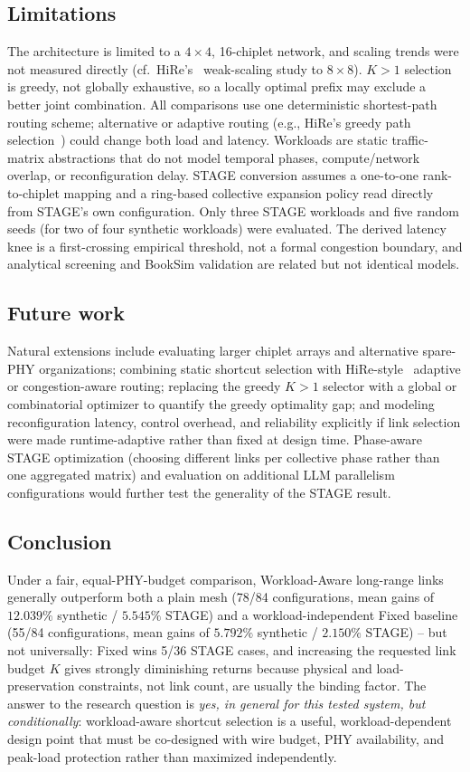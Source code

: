 \documentclass[conference]{IEEEtran}
\begin{document}
\subsection{Limitations}
The architecture is limited to a $4\times4$, 16-chiplet network, and scaling trends were not measured directly (cf.\ HiRe's~\cite{hire} weak-scaling study to $8\times8$). $K{>}1$ selection is greedy, not globally exhaustive, so a locally optimal prefix may exclude a better joint combination. All comparisons use one deterministic shortest-path routing scheme; alternative or adaptive routing (e.g., HiRe's greedy path selection~\cite{hire}) could change both load and latency. Workloads are static traffic-matrix abstractions that do not model temporal phases, compute/network overlap, or reconfiguration delay. STAGE conversion assumes a one-to-one rank-to-chiplet mapping and a ring-based collective expansion policy read directly from STAGE's own configuration. Only three STAGE workloads and five random seeds (for two of four synthetic workloads) were evaluated. The derived latency knee is a first-crossing empirical threshold, not a formal congestion boundary, and analytical screening and BookSim validation are related but not identical models.

\subsection{Future work}
Natural extensions include evaluating larger chiplet arrays and alternative spare-PHY organizations; combining static shortcut selection with HiRe-style~\cite{hire} adaptive or congestion-aware routing; replacing the greedy $K{>}1$ selector with a global or combinatorial optimizer to quantify the greedy optimality gap; and modeling reconfiguration latency, control overhead, and reliability explicitly if link selection were made runtime-adaptive rather than fixed at design time. Phase-aware STAGE optimization (choosing different links per collective phase rather than one aggregated matrix) and evaluation on additional LLM parallelism configurations would further test the generality of the STAGE result.

\subsection{Conclusion}
Under a fair, equal-PHY-budget comparison, Workload-Aware long-range links generally outperform both a plain mesh (78/84 configurations, mean gains of $12.039\%$ synthetic / $5.545\%$ STAGE) and a workload-independent Fixed baseline (55/84 configurations, mean gains of $5.792\%$ synthetic / $2.150\%$ STAGE) -- but not universally: Fixed wins 5/36 STAGE cases, and increasing the requested link budget $K$ gives strongly diminishing returns because physical and load-preservation constraints, not link count, are usually the binding factor. The answer to the research question is \emph{yes, in general for this tested system, but conditionally}: workload-aware shortcut selection is a useful, workload-dependent design point that must be co-designed with wire budget, PHY availability, and peak-load protection rather than maximized independently.
\end{document}
